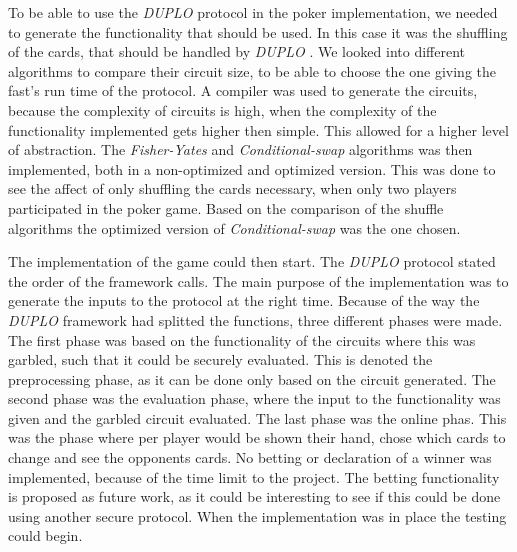 \documentclass[twoside,11pt,openright]{report}
\newcommand{\FY}{\textit{Fisher-Yates} }
\newcommand{\CS}{\textit{Conditional-swap} }
\newcommand{\DUPLO}{\textit{DUPLO} }
\begin{document}
To be able to use the \DUPLO protocol in the poker implementation, we needed to generate the functionality that should be used. In this case it was the shuffling of the cards, that should be handled by \DUPLO. We looked into different algorithms to compare their circuit size, to be able to choose the one giving the fast's run time of the protocol. A compiler was used to generate the circuits, because the complexity of circuits is high, when the complexity of the functionality implemented gets higher then simple. This allowed for a higher level of abstraction. The \FY and \CS algorithms was then implemented, both in a non-optimized and optimized version. This was done to see the affect of only shuffling the cards necessary, when only two players participated in the poker game. Based on the comparison of the shuffle algorithms the optimized version of \CS was the one chosen.

The implementation of the game could then start. The \DUPLO protocol stated the order of the framework calls. The main purpose of the implementation was to generate the inputs to the protocol at the right time. Because of the way the \DUPLO framework had splitted the functions, three different phases were made. The first phase was based on the functionality of the circuits where this was garbled, such that it could be securely evaluated. This is denoted the preprocessing phase, as it can be done only based on the circuit generated. The second phase was the evaluation phase, where the input to the functionality was given and the garbled circuit evaluated. The last phase was the online phas. This was the phase where per player would be shown their hand, chose which cards to change and see the opponents cards. No betting or declaration of a winner was implemented, because of the time limit to the project. The betting functionality is proposed as future work, as it could be interesting to see if this could be done using another secure protocol. When the implementation was in place the testing could begin.
\end{document}
